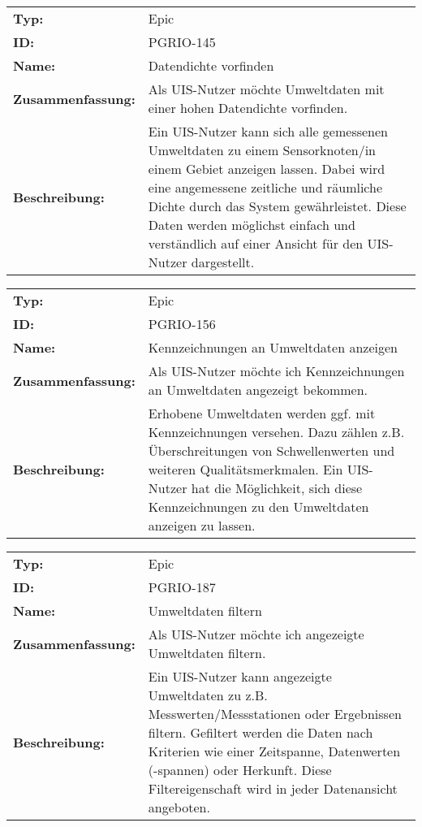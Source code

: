 		\begin{flushleft} 
\begin{tabular}{@{}lp{100mm}} 
\textbf{Typ:} & Epic \\ 
\textbf{ID:} & PGRIO-145 \\ 
\textbf{Name:} & Datendichte vorfinden \\ 
\textbf{Zusammenfassung:} & Als UIS-Nutzer möchte Umweltdaten mit einer hohen Datendichte vorfinden. \\ 
\textbf{Beschreibung:} & Ein UIS-Nutzer kann sich alle gemessenen Umweltdaten zu einem Sensorknoten/in einem Gebiet anzeigen lassen. Dabei wird eine angemessene zeitliche und räumliche Dichte durch das System gewährleistet. Diese Daten werden möglichst einfach und verständlich auf einer Ansicht für den UIS-Nutzer dargestellt. \\ 
\end{tabular} 
\end{flushleft} 

		\begin{flushleft} 
\begin{tabular}{@{}lp{100mm}} 
\textbf{Typ:} & Epic \\ 
\textbf{ID:} & PGRIO-156 \\ 
\textbf{Name:} & Kennzeichnungen an Umweltdaten anzeigen \\ 
\textbf{Zusammenfassung:} & Als UIS-Nutzer möchte ich Kennzeichnungen an Umweltdaten angezeigt bekommen. \\ 
\textbf{Beschreibung:} & Erhobene Umweltdaten werden ggf. mit Kennzeichnungen versehen. Dazu zählen z.B. Überschreitungen von Schwellenwerten und weiteren Qualitätsmerkmalen. Ein UIS-Nutzer hat die Möglichkeit, sich diese Kennzeichnungen zu den Umweltdaten anzeigen zu lassen. \\ 
\end{tabular} 
\end{flushleft} 

		\begin{flushleft} 
\begin{tabular}{@{}lp{100mm}} 
\textbf{Typ:} & Epic \\ 
\textbf{ID:} & PGRIO-187 \\ 
\textbf{Name:} & Umweltdaten filtern \\ 
\textbf{Zusammenfassung:} & Als UIS-Nutzer möchte ich angezeigte Umweltdaten filtern. \\ 
\textbf{Beschreibung:} & Ein UIS-Nutzer kann angezeigte Umweltdaten zu z.B. Messwerten/Messstationen oder Ergebnissen filtern. Gefiltert werden die Daten nach Kriterien wie einer Zeitspanne, Datenwerten (-spannen) oder Herkunft. Diese Filtereigenschaft wird in jeder Datenansicht angeboten. \\ 
\end{tabular} 
\end{flushleft} 

